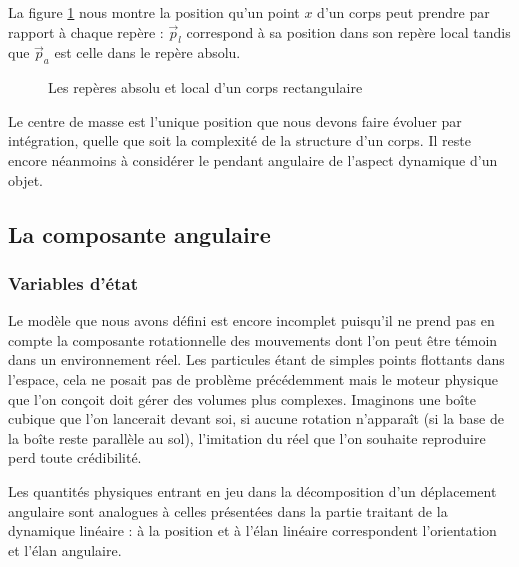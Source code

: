 La figure \ref{reperelocal} nous montre la position qu'un point $x$
d'un corps peut prendre par rapport à chaque repère : $\vec{p}_l$
correspond à sa position dans son repère local tandis que $\vec{p}_a$
est celle dans le repère absolu.

\begin{figure}
  \centering
  
  \caption{Les repères absolu et local d'un corps rectangulaire}
  \label{reperelocal}
\end{figure}

Le centre de masse est l'unique position que nous devons faire évoluer
par intégration, quelle que soit la complexité de la structure d'un
corps. Il reste encore néanmoins à considérer le pendant angulaire de
l'aspect dynamique d'un objet.

\subsection{La composante angulaire}

\subsubsection{Variables d'état}

Le modèle que nous avons défini est encore incomplet puisqu'il ne
prend pas en compte la composante rotationnelle des mouvements dont
l'on peut être témoin dans un environnement réel. Les particules étant
de simples points flottants dans l'espace, cela ne posait pas de
problème précédemment mais le moteur physique que l'on conçoit doit
gérer des volumes plus complexes. Imaginons une boîte cubique que l'on
lancerait devant soi, si aucune rotation n'apparaît (si la base de la
boîte reste parallèle au sol), l'imitation du réel que l'on souhaite
reproduire perd toute crédibilité.

Les quantités physiques entrant en jeu dans la décomposition d'un
déplacement angulaire sont analogues à celles présentées dans la
partie traitant de la dynamique linéaire : à la position et à l'élan
linéaire correspondent l'orientation et l'élan angulaire.

